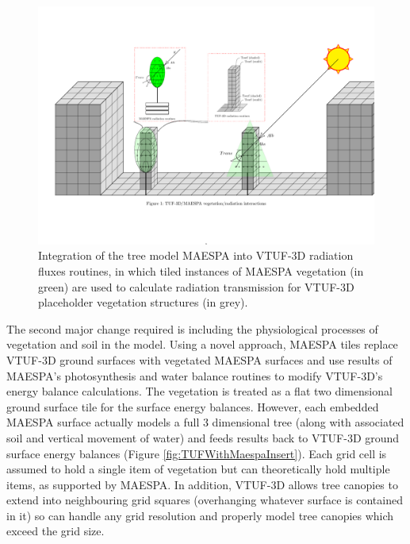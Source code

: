 \documentclass[final,3p,times,authoryear]{elsarticle}
\begin{document}
\begin{figure}[!htbp]
 \includegraphics[trim = 15mm 41mm 0mm 31mm, clip, scale=0.45]{images/TUFWithMaespaVegRadiation.pdf}  
 \caption{Integration of the tree model MAESPA into VTUF-3D radiation fluxes routines, in which tiled instances of MAESPA vegetation (in green) are used to calculate radiation transmission for VTUF-3D placeholder vegetation structures (in grey)\label{fig:TUFWithMaespaVegRadiation}.}
\end{figure}

The second major change required is including the physiological processes of vegetation and soil in the model. Using a novel approach, MAESPA tiles replace VTUF-3D ground surfaces with vegetated MAESPA surfaces and use results of MAESPA's photosynthesis and water balance routines to modify VTUF-3D's energy balance calculations. The vegetation is treated as a flat two dimensional ground surface tile for the surface energy balances. However, each embedded MAESPA surface actually models a full 3 dimensional tree (along with associated soil and vertical movement of water) and feeds results back to VTUF-3D ground surface energy balances (Figure \ref{fig:TUFWithMaespaInsert}). Each grid cell is assumed to hold a single item of vegetation but can theoretically hold multiple items, as supported by MAESPA. In addition, VTUF-3D allows tree canopies to extend into neighbouring grid squares (overhanging whatever surface is contained in it) so can handle any grid resolution and properly model tree canopies which exceed the grid size.  
\end{document}
